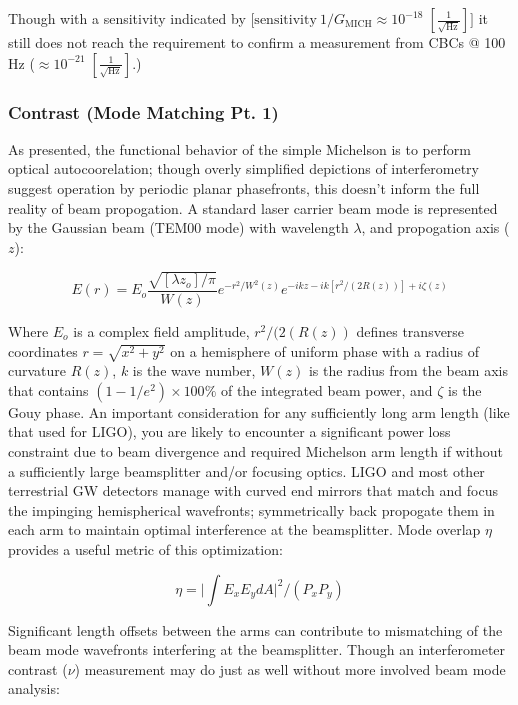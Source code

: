 Though with a sensitivity indicated by [$\mathrm{sensitivity} ~ 1/G_\mathrm{MICH} \approx 10^{-18} \; [\frac{1}{\sqrt{\mathrm{Hz}}}]]$ it still does not reach the requirement to confirm a measurement from CBCs @ 100 Hz ($\approx 10^{-21} \; [\frac{1}{\sqrt{\mathrm{Hz}}}]$.)

\subsubsection{Contrast (Mode Matching Pt. 1)}
As presented, the functional behavior of the simple Michelson is to perform optical autocoorelation; though overly simplified depictions of interferometry suggest operation by periodic planar phasefronts, this doesn't inform the full reality of beam propogation. A standard laser carrier beam mode is represented by the Gaussian beam (TEM00 mode) with wavelength $\lambda$, and propogation axis ($z$):

\begin{equation}\label{eq:gaussianbeam}
E(r) = E_o \frac{\sqrt{[\lambda z_o] / \pi}}{W(z)}e^{-r^2 / W^2(z)} e^{-ikz - ik[r^2 / (2R(z))] + i \zeta(z)}
\end{equation}

Where $E_o$ is a complex field amplitude, $r^{2}/(2(R(z))$ defines transverse coordinates $r = \sqrt{x^{2} + y^{2}}$ on a hemisphere of uniform phase with a radius of curvature $R(z)$, $k$ is the wave number, $W(z)$ is the radius from the beam axis that contains $(1-1/e^2) \times 100 \%$ of the integrated beam power, and $\zeta$ is the Gouy phase. An important consideration for any sufficiently long arm length (like that used for LIGO), you are likely to encounter a significant power loss constraint due to beam divergence and required Michelson arm length if without a sufficiently large beamsplitter and/or focusing optics. LIGO and most other terrestrial GW detectors manage with curved end mirrors that match and focus the impinging hemispherical wavefronts; symmetrically back propogate them in each arm to maintain optimal interference at the beamsplitter. Mode overlap $\eta$ provides a useful metric of this optimization: 

\begin{equation}\label{eq:modeoverlap}
	\eta = \bigg|\int E_x E_y dA \bigg|^{2} \bigg/ (P_x P_y) 
\end{equation}

Significant length offsets between the arms can contribute to mismatching of the beam mode wavefronts interfering at the beamsplitter. Though an interferometer contrast ($\nu$) measurement may do just as well without more involved beam mode analysis:

